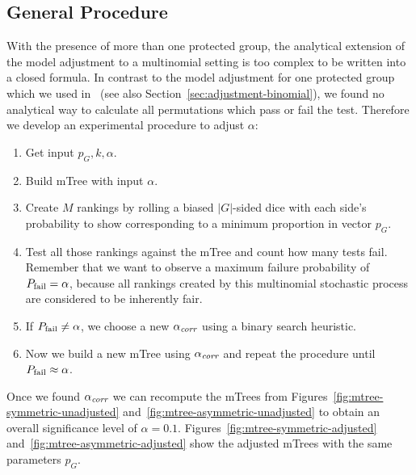\subsection{General Procedure}
\label{subsec:general-process}
%
With the presence of more than one protected group, the analytical extension of the model adjustment to a multinomial setting is too complex to be written into a closed formula.
%
In contrast to the model adjustment for one protected group which we used in~\cite{zehlike2017fair} (see also Section~\ref{sec:adjustment-binomial}), we found no analytical way to calculate all permutations which pass or fail the test.
%
Therefore we develop an experimental procedure to adjust $ \alpha $:
%
\begin{enumerate}
	\item Get input $ p_G, k, \alpha $.
	\item Build mTree with input $ \alpha $.
	\item Create $M$ rankings by rolling a biased $ |G| $-sided dice with each side's probability to show corresponding to a minimum proportion in vector $ p_G $.
	\item Test all those rankings against the mTree and count how many tests fail.
	Remember that we want to observe a maximum failure probability of $ P_{\operatorname{fail}}=\alpha $, because all rankings created by this multinomial stochastic process are considered to be inherently fair.
	\item If $ P_{\operatorname{fail}} \neq \alpha $, we choose a new $ \alpha_\textit{corr} $ using a binary search heuristic.
	\item Now we build a new mTree using $ \alpha_\textit{corr} $ and repeat the procedure until $ P_{\operatorname{fail}} \approx \alpha $.
\end{enumerate}
%
Once we found $\alpha_\textit{corr}$ we can recompute the mTrees from Figures~\ref{fig:mtree-symmetric-unadjusted} and~\ref{fig:mtree-asymmetric-unadjusted} to obtain an overall significance level of $\alpha = 0.1$.
%
Figures~\ref{fig:mtree-symmetric-adjusted} and~\ref{fig:mtree-asymmetric-adjusted} show the adjusted mTrees with the same parameters $p_G$.


